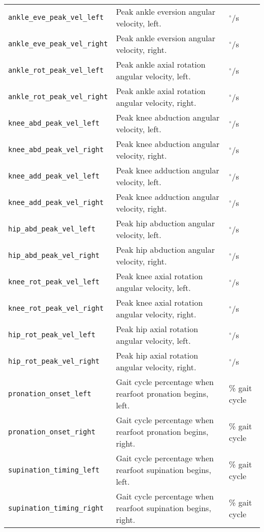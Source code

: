 {\begin{longtable}{@{}p{} p{} p{}@{}}
    \texttt{ankle\_eve\_peak\_vel\_left} & Peak ankle eversion angular velocity, left. & $^\circ$/s \\
    \texttt{ankle\_eve\_peak\_vel\_right} & Peak ankle eversion angular velocity, right. & $^\circ$/s \\
    \texttt{ankle\_rot\_peak\_vel\_left} & Peak ankle axial rotation angular velocity, left. & $^\circ$/s \\
    \texttt{ankle\_rot\_peak\_vel\_right} & Peak ankle axial rotation angular velocity, right. & $^\circ$/s \\
    \texttt{knee\_abd\_peak\_vel\_left} & Peak knee abduction angular velocity, left. & $^\circ$/s \\
    \texttt{knee\_abd\_peak\_vel\_right} & Peak knee abduction angular velocity, right. & $^\circ$/s \\
    \texttt{knee\_add\_peak\_vel\_left} & Peak knee adduction angular velocity, left. & $^\circ$/s \\
    \texttt{knee\_add\_peak\_vel\_right} & Peak knee adduction angular velocity, right. & $^\circ$/s \\
    \texttt{hip\_abd\_peak\_vel\_left} & Peak hip abduction angular velocity, left. & $^\circ$/s \\
    \texttt{hip\_abd\_peak\_vel\_right} & Peak hip abduction angular velocity, right. & $^\circ$/s \\
    \texttt{knee\_rot\_peak\_vel\_left} & Peak knee axial rotation angular velocity, left. & $^\circ$/s \\
    \texttt{knee\_rot\_peak\_vel\_right} & Peak knee axial rotation angular velocity, right. & $^\circ$/s \\
    \texttt{hip\_rot\_peak\_vel\_left} & Peak hip axial rotation angular velocity, left. & $^\circ$/s \\
    \texttt{hip\_rot\_peak\_vel\_right} & Peak hip axial rotation angular velocity, right. & $^\circ$/s \\
    \texttt{pronation\_onset\_left} & Gait cycle percentage when rearfoot pronation begins, left. & \% gait cycle \\
    \texttt{pronation\_onset\_right} & Gait cycle percentage when rearfoot pronation begins, right. & \% gait cycle \\
    \texttt{supination\_timing\_left} & Gait cycle percentage when rearfoot supination begins, left. & \% gait cycle \\
    \texttt{supination\_timing\_right} & Gait cycle percentage when rearfoot supination begins, right. & \% gait cycle \\

\end{longtable}}

